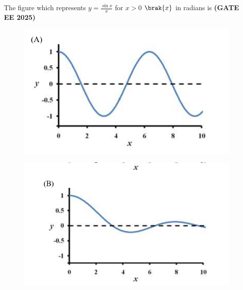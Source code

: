 \documentclass[journal,12pt,onecolumn]{IEEEtran}
\theoremstyle{remark}
\begin{document}
\begin{enumerate}
\newpage
The figure which represents $y=\frac{\sin x}{x}$ for $x>0$ $\brak{x}$ in radians is \hfill \textbf{(GATE EE 2025)}
\begin{figure}
\begin{center}
\includegraphics[width=0.7\columnwidth]{figs/4a.png}
	\caption{}
	\label{fig4a}
\end{center}
\end{figure}
\begin{figure}
\begin{center}
\includegraphics[width=0.7\columnwidth]{figs/4b.png}
	\caption{}
	\label{fig4b}
\end{center}
	\end{figure}
	\begin{figure}


\end{figure}
\end{enumerate}
\end{document}
